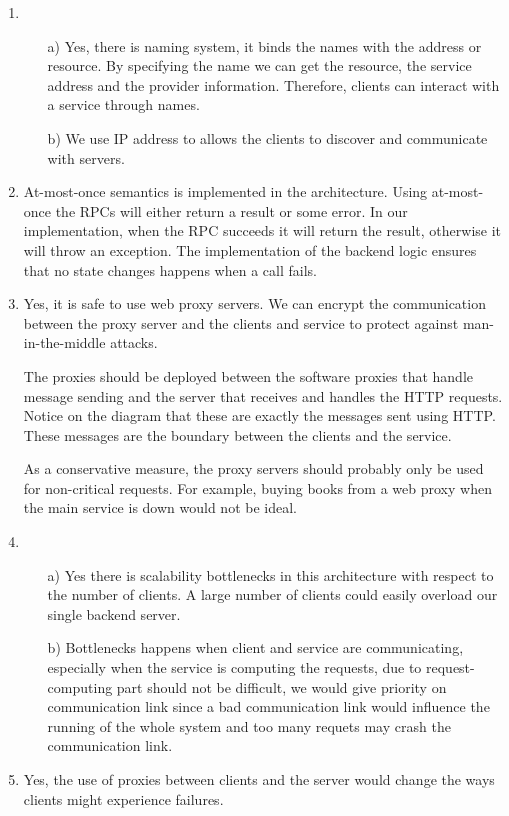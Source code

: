 \documentclass[11pt]{article}
\begin{document}
\begin{enumerate}
\begin{itemize}
    \end{itemize}
  \item
    \begin{itemize}
      \item[a)]
        Yes, there is naming system, it binds the names with the address or
        resource.  By specifying the name  we can get the resource, the service
        address and the provider information. Therefore, clients can interact with a
        service through names.

      \item[b)]
        We use IP address to allows the clients to discover and communicate with
        servers.
    \end{itemize}
  \item
    At-most-once semantics is implemented in the architecture. Using at-most-once
    the RPCs will either return a result or some error. In our
    implementation, when the RPC succeeds it will return the result, otherwise it
    will throw an exception. The implementation of the backend logic ensures
    that no state changes happens when a call fails.
  \item
    Yes, it is safe to use web proxy servers. We can encrypt the
    communication between the proxy server and the clients and service to
    protect against man-in-the-middle attacks. 

    The proxies should be deployed between the software proxies that handle
    message sending and the server that receives and handles the HTTP requests.
    Notice on the diagram that these are exactly the messages sent using HTTP.
    These messages are the boundary between the clients and the service.

    As a conservative measure, the proxy servers should probably only be used
    for non-critical requests. For example, buying books from a web proxy when
    the main service is down would not be ideal.
  \item
   \begin{itemize}
      \item[a)]
    Yes there is scalability bottlenecks in this architecture with respect to the
    number of clients. A large number of clients could easily overload our
    single backend server. 
      \item[b)]
     Bottlenecks happens when client and service are communicating, especially 
     when the service is computing the requests, due to request-computing part 
     should not be difficult, we would give priority on communication link since
     a bad communication link would influence the running of the whole system and 
     too many requets may crash the communication link.
     \end{itemize}    
  \item
    Yes, the use of proxies between clients and the server would change the ways
    clients might experience failures.
    

\end{enumerate}
\end{document}
